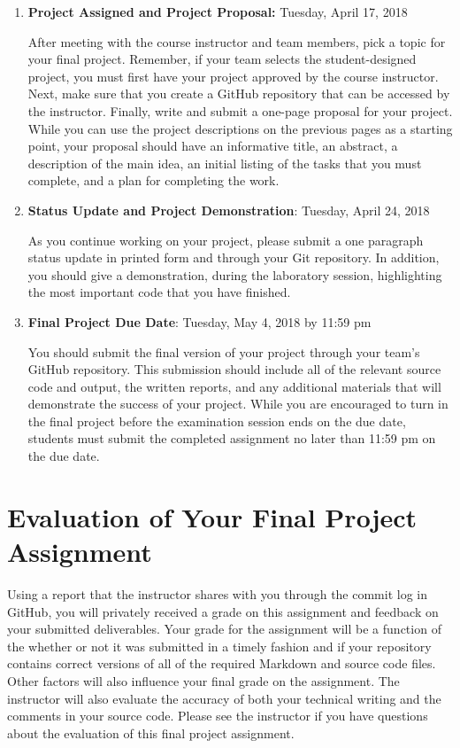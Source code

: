 \documentclass[11pt]{article}
\begin{document}
\begin{enumerate}

  \item {\bf Project Assigned and Project Proposal:} Tuesday, April 17, 2018

    After meeting with the course instructor and team members, pick a topic for
    your final project. Remember, if your team selects the student-designed
    project, you must first have your project approved by the course instructor.
    Next, make sure that you create a GitHub repository that can be accessed by
    the instructor. Finally, write and submit a one-page proposal for your
    project. While you can use the project descriptions on the previous pages as
    a starting point, your proposal should have an informative title, an
    abstract, a description of the main idea, an initial listing of the tasks
    that you must complete, and a plan for completing the work.

  \item {\bf Status Update and Project Demonstration}: Tuesday, April 24, 2018

    As you continue working on your project, please submit a one paragraph
    status update in printed form and through your Git repository. In addition,
    you should give a demonstration, during the laboratory session, highlighting
    the most important code that you have finished.

  \item {\bf Final Project Due Date}: Tuesday, May 4, 2018 by 11:59 pm

    You should submit the final version of your project through your team's
    GitHub repository. This submission should include all of the relevant source
    code and output, the written reports, and any additional materials that will
    demonstrate the success of your project. While you are encouraged to turn in
    the final project before the examination session ends on the due date,
    students must submit the completed assignment no later than 11:59 pm on the
    due date.

\end{enumerate}

\section*{Evaluation of Your Final Project Assignment}

Using a report that the instructor shares with you through the commit log in GitHub, you will privately received a grade
on this assignment and feedback on your submitted deliverables. Your grade for the assignment will be a function of the
whether or not it was submitted in a timely fashion and if your repository contains correct versions of all of the
required Markdown and source code files. Other factors will also influence your final grade on the assignment. The
instructor will also evaluate the accuracy of both your technical writing and the comments in your source code. Please
see the instructor if you have questions about the evaluation of this final project assignment.
\end{document}
